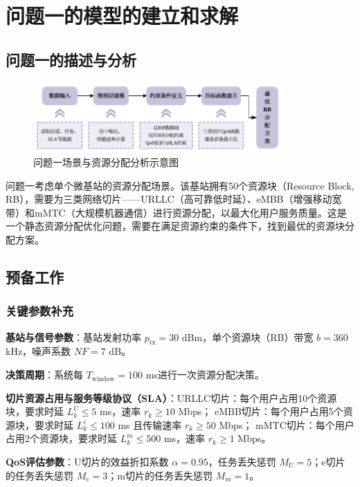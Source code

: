 \section{问题一的模型的建立和求解}
\subsection{问题一的描述与分析}
\begin{figure}[htbp]
    \centering
    \includegraphics[width=0.85\textwidth]{figures/第一问分析.pdf}
    \caption{问题一场景与资源分配分析示意图}
    \label{fig:q1-analysis}
\end{figure}

问题一考虑单个微基站的资源分配场景。该基站拥有50个资源块（Resource Block, RB），需要为三类网络切片——URLLC（高可靠低时延）、eMBB（增强移动宽带）和mMTC（大规模机器通信）进行资源分配，以最大化用户服务质量。这是一个静态资源分配优化问题，需要在满足资源约束的条件下，找到最优的资源块分配方案。

\subsection{预备工作}
\subsubsection{关键参数补充}

\textbf{基站与信号参数}：基站发射功率 $p_{\text{tx}} = 30$ dBm，单个资源块（RB）带宽 $b = 360$ kHz，噪声系数 $NF = 7$ dB。

\textbf{决策周期}：系统每 $T_{\text{window}} = 100$ ms进行一次资源分配决策。

\textbf{切片资源占用与服务等级协议（SLA）}：URLLC切片：每个用户占用10个资源块，要求时延 $L_k^U \leq 5$ ms，速率 $r_k \geq 10$ Mbps；
eMBB切片：每个用户占用5个资源块，要求时延 $L_k^e \leq 100$ ms 且传输速率 $r_k \geq 50$ Mbps；
mMTC切片：每个用户占用2个资源块，要求时延 $L_k^m \leq 500$ ms，速率 $r_k \geq 1$ Mbps。


\textbf{QoS评估参数}：U切片的效益折扣系数 $\alpha = 0.95$，任务丢失惩罚 $M_U = 5$；e切片的任务丢失惩罚 $M_e = 3$；m切片的任务丢失惩罚 $M_m = 1$。

